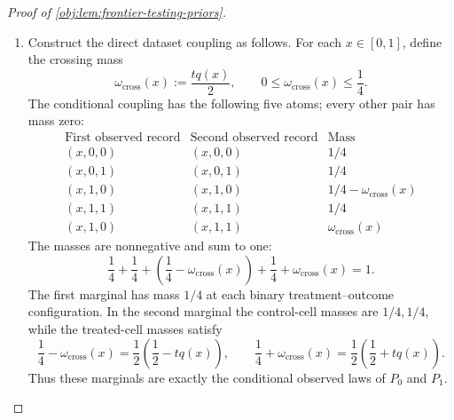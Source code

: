 \begin{proof}[Proof of \cref{obj:lem:frontier-testing-priors}]
\begin{enumerate}
The covariate density is one, and the propensity and control regression
are constant \(1/2\). In particular,
\[
|e_{P_1}(x)-e_{P_1}(x')|
=|\mu_{0,P_1}(x)-\mu_{0,P_1}(x')|
=0\le L|x-x'|^{1/10}.
\]
These facts give the density, overlap, and nuisance smoothness conditions.
The conditional independent generation in
\cref{obj:def:direct-family} gives exchangeability, and setting
\(Y=Y(A)\) gives consistency. Thus, using
\cref{obj:def:complete-model},
\[
P_1\in\mathcal P,\qquad
\theta(P_1)=tq(x_0)=t=\Delta.
\]
Uniform averaging over either singleton leaves its product law unchanged:
\[
Q^{(0)}=(P_0^{\mathrm{obs}})^{\otimes n},\qquad
Q^{(1)}=(P_1^{\mathrm{obs}})^{\otimes n}.
\]

\item Construct the direct dataset coupling as follows. For each
\(x\in[0,1]\), define the crossing mass
\[
\omega_{\mathrm{cross}}(x):=\frac{tq(x)}2,
\qquad
0\le\omega_{\mathrm{cross}}(x)\le\frac14.
\]
The conditional coupling has the following five atoms; every other pair
has mass zero:
\[
\begin{array}{c|c|c}
\text{First observed record}&\text{Second observed record}&\text{Mass}\\ \hline
(x,0,0)&(x,0,0)&1/4\\
(x,0,1)&(x,0,1)&1/4\\
(x,1,0)&(x,1,0)&1/4-\omega_{\mathrm{cross}}(x)\\
(x,1,1)&(x,1,1)&1/4\\
(x,1,0)&(x,1,1)&\omega_{\mathrm{cross}}(x)
\end{array}
\]
The masses are nonnegative and sum to one:
\[
\frac14+\frac14+
\left(\frac14-\omega_{\mathrm{cross}}(x)\right)
+\frac14+\omega_{\mathrm{cross}}(x)=1.
\]
The first marginal has mass \(1/4\) at each binary treatment--outcome
configuration. In the second marginal the control-cell masses are
\(1/4,1/4\), while the treated-cell masses satisfy
\[
\frac14-\omega_{\mathrm{cross}}(x)
=\frac12\left(\frac12-tq(x)\right),\qquad
\frac14+\omega_{\mathrm{cross}}(x)
=\frac12\left(\frac12+tq(x)\right).
\]
Thus these marginals are exactly the conditional observed laws of
\(P_0\) and \(P_1\).


\end{enumerate}
\end{proof}
